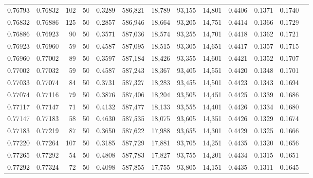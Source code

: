 \begin{tabular}{rrrrrrrrrrrrr}
0.76793 & 0.76832 &   102 &  50 &                                     0.3289 & 586,821 &  18,789 &  93,155 &  14,801 & 0.4406 & 0.1371 & 0.1740 \\
0.76832 & 0.76886 &   125 &  50 &                                     0.2857 & 586,946 &  18,664 &  93,205 &  14,751 & 0.4414 & 0.1366 & 0.1729 \\
0.76886 & 0.76923 &    90 &  50 &                                     0.3571 & 587,036 &  18,574 &  93,255 &  14,701 & 0.4418 & 0.1362 & 0.1721 \\
0.76923 & 0.76960 &    59 &  50 &                                     0.4587 & 587,095 &  18,515 &  93,305 &  14,651 & 0.4417 & 0.1357 & 0.1715 \\
0.76960 & 0.77002 &    89 &  50 &                                     0.3597 & 587,184 &  18,426 &  93,355 &  14,601 & 0.4421 & 0.1352 & 0.1707 \\
0.77002 & 0.77032 &    59 &  50 &                                     0.4587 & 587,243 &  18,367 &  93,405 &  14,551 & 0.4420 & 0.1348 & 0.1701 \\
0.77033 & 0.77074 &    84 &  50 &                                     0.3731 & 587,327 &  18,283 &  93,455 &  14,501 & 0.4423 & 0.1343 & 0.1694 \\
0.77074 & 0.77116 &    79 &  50 &                                     0.3876 & 587,406 &  18,204 &  93,505 &  14,451 & 0.4425 & 0.1339 & 0.1686 \\
0.77117 & 0.77147 &    71 &  50 &                                     0.4132 & 587,477 &  18,133 &  93,555 &  14,401 & 0.4426 & 0.1334 & 0.1680 \\
0.77147 & 0.77183 &    58 &  50 &                                     0.4630 & 587,535 &  18,075 &  93,605 &  14,351 & 0.4426 & 0.1329 & 0.1674 \\
0.77183 & 0.77219 &    87 &  50 &                                     0.3650 & 587,622 &  17,988 &  93,655 &  14,301 & 0.4429 & 0.1325 & 0.1666 \\
0.77220 & 0.77264 &   107 &  50 &                                     0.3185 & 587,729 &  17,881 &  93,705 &  14,251 & 0.4435 & 0.1320 & 0.1656 \\
0.77265 & 0.77292 &    54 &  50 &                                     0.4808 & 587,783 &  17,827 &  93,755 &  14,201 & 0.4434 & 0.1315 & 0.1651 \\
0.77292 & 0.77324 &    72 &  50 &                                     0.4098 & 587,855 &  17,755 &  93,805 &  14,151 & 0.4435 & 0.1311 & 0.1645 \\

\end{tabular}
